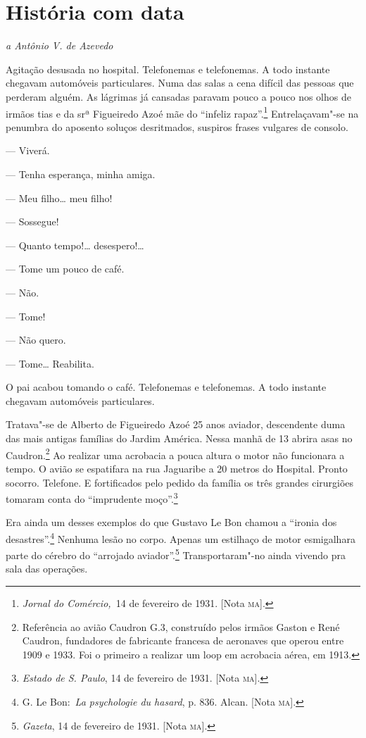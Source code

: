 \chapter{História com data}

\hfill{}\emph{a Antônio V. de Azevedo}\bigskip

\begin{linenumbers}
\noindent{}Agitação desusada no hospital. Telefonemas e telefonemas. A todo
instante chegavam automóveis particulares. Numa das salas a cena difícil
das pessoas que perderam alguém. As lágrimas já cansadas paravam pouco a
pouco nos olhos de irmãos tias e da srª Figueiredo Azoé mãe do ``infeliz
rapaz''.\footnote{\emph{Jornal do Comércio,~}14 de fevereiro de 1931.
  {[}Nota \textsc{ma}{]}.} Entrelaçavam"-se na penumbra do aposento soluços
desritmados, suspiros frases vulgares de consolo.

--- Viverá.

--- Tenha esperança, minha amiga.

--- Meu filho\ldots{} meu filho!

--- Sossegue!

--- Quanto tempo!\ldots{} desespero!\ldots{}

--- Tome um pouco de café.

--- Não.

--- Tome!

--- Não quero.

--- Tome\ldots{} Reabilita.

O pai acabou tomando o café. Telefonemas e telefonemas. A todo instante
chegavam automóveis particulares.

Tratava"-se de Alberto de Figueiredo Azoé 25 anos aviador, descendente
duma das mais antigas famílias do Jardim América. Nessa manhã de 13
abrira asas no Caudron.\footnote{Referência ao avião Caudron G.3,
  construído pelos irmãos Gaston e René Caudron, fundadores de
  fabricante francesa de aeronaves que operou entre 1909 e 1933. Foi o
  primeiro a realizar um loop em acrobacia aérea, em 1913.} Ao realizar
uma acrobacia a pouca altura o motor não funcionara a tempo. O avião se
espatifara na rua Jaguaribe a 20 metros do Hospital. Pronto socorro.
Telefone. E fortificados pelo pedido da família os três grandes
cirurgiões tomaram conta do ``imprudente moço''.\footnote{\emph{Estado de
  S. Paulo}, 14 de fevereiro de 1931. {[}Nota \textsc{ma}{]}.}

Era ainda um desses exemplos do que Gustavo Le Bon chamou a ``ironia dos
desastres''.\footnote{G. Le Bon:~\emph{La psychologie du hasard}, p. 836.
  Alcan. {[}Nota \textsc{ma}{]}.} Nenhuma lesão no corpo. Apenas um estilhaço de
motor esmigalhara parte do cérebro do ``arrojado aviador''.\footnote{\emph{Gazeta},
  14 de fevereiro de 1931. {[}Nota \textsc{ma}{]}.} Transportaram"-no ainda
vivendo pra sala das operações.


\end{linenumbers}
